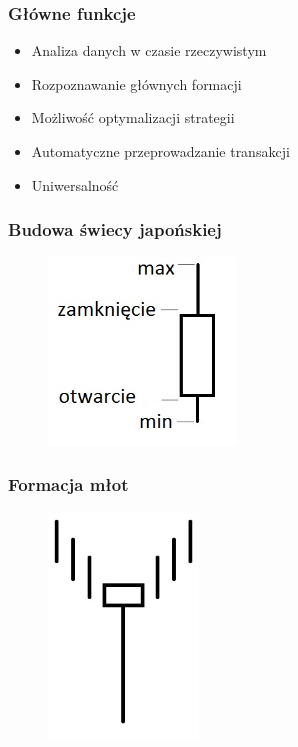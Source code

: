 \documentclass{beamer}
\begin{document}

\begin{frame}
\frametitle{Główne funkcje}

\begin{itemize}

\item Analiza danych w czasie rzeczywistym
\item Rozpoznawanie głównych formacji 
\item Możliwość optymalizacji strategii
\item Automatyczne przeprowadzanie transakcji
\item Uniwersalność

\end{itemize}

\end{frame}


\begin{frame}
\frametitle{Budowa świecy japońskiej}
\begin{figure}[ht]
\begin{center}
\includegraphics[width=5cm]{candle.jpg}
\end{center}
\end{figure} 


\end{frame}


\begin{frame}
\frametitle{Formacja młot}
\begin{figure}[ht]
\begin{center}
\includegraphics[width=4cm]{hammer.jpg}
\end{center}
\end{figure} 


\end{frame}
\end{document}

